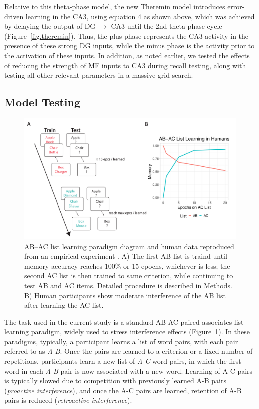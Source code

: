 \documentclass[11pt,twoside]{article}
\newif\myifpdf
\begin{document}
Relative to this theta-phase model, the new Theremin model introduces error-driven learning in the CA3, using equation 4 as shown above, which was achieved by delaying the output of DG $\rightarrow$ CA3 until the 2nd theta phase cycle (Figure~\ref{fig.theremin}).  Thus, the plus phase represents the CA3 activity in the presence of these strong DG inputs, while the minus phase is the activity prior to the activation of these inputs.  In addition, as noted earlier, we tested the effects of reducing the strength of MF inputs to CA3 during recall testing, along with testing all other relevant parameters in a massive grid search.

\subsection{Model Testing}

\begin{figure}
  \centering\includegraphics[width=5in]{fig_hip_edl_abac}
  \caption{\footnotesize AB--AC list learning paradigm diagram and human data reproduced from an empirical experiment \citep{BarnesUnderwood59}. A) The first AB list is traind until memory accuracy reaches 100\% or 15 epochs, whichever is less; the second AC list is then trained to same criterion, while continuing to test AB and AC items.  Detailed procedure is described in Methods. B) Human participants show moderate interference of the AB list after learning the AC list.}
\label{fig.abac}
\end{figure}

The task used in the current study is a standard AB-AC paired-associates list-learning paradigm, widely used to stress interference effects \citep{BarnesUnderwood59,McCloskeyCohen89} (Figure~\ref{fig.abac}). In these paradigms, typically, a participant learns a list of word pairs, with each pair referred to as \emph{A-B}. Once the pairs are learned to a criterion or a fixed number of repetitions, participants learn a new list of \emph{A-C} word pairs, in which the first word in each \emph{A-B} pair is now associated with a new word. Learning of A-C pairs is typically slowed due to competition with previously learned A-B pairs (\emph{proactive interference}), and once the A-C pairs are learned, retention of A-B pairs is reduced (\emph{retroactive interference}).
\end{document}
